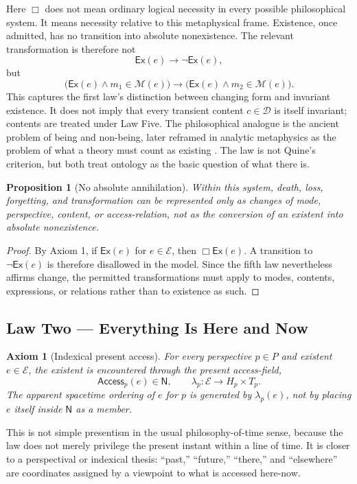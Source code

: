 \documentclass[11pt]{article}
\newtheorem{axiom}{Axiom}
\newtheorem{proposition}{Proposition}
\newcommand{\Ex}{\mathsf{Ex}}
\newcommand{\Now}{\mathsf{N}}
\newcommand{\Ent}{\mathcal{E}}
\newcommand{\Modes}{\mathcal{M}}
\newcommand{\Contents}{\mathcal{D}}
\newcommand{\Access}{\mathsf{Access}}
\begin{document}
Here $\Box$ does not mean ordinary logical necessity in every possible philosophical system.  It means necessity relative to this metaphysical frame.  Existence, once admitted, has no transition into absolute nonexistence.  The relevant transformation is therefore not
\[
\Ex(e) \longrightarrow \neg \Ex(e),
\]
but
\[
\bigl(\Ex(e)\wedge m_1\in\Modes(e)\bigr)
\longrightarrow
\bigl(\Ex(e)\wedge m_2\in\Modes(e)\bigr).
\]
This captures the first law's distinction between changing form and invariant existence.  It does not imply that every transient content $c\in\Contents$ is itself invariant; contents are treated under Law Five.  The philosophical analogue is the ancient problem of being and non-being, later reframed in analytic metaphysics as the problem of what a theory must count as existing \cite{Quine1948,Palmer2020}.  The law is not Quine's criterion, but both treat ontology as the basic question of what there is.

\begin{proposition}[No absolute annihilation]
Within this system, death, loss, forgetting, and transformation can be represented only as changes of mode, perspective, content, or access-relation, not as the conversion of an existent into absolute nonexistence.
\end{proposition}

\begin{proof}
By Axiom 1, if $\Ex(e)$ for $e\in\Ent$, then $\Box\Ex(e)$.  A transition to $\neg\Ex(e)$ is therefore disallowed in the model.  Since the fifth law nevertheless affirms change, the permitted transformations must apply to modes, contents, expressions, or relations rather than to existence as such.
\end{proof}

\subsection{Law Two --- Everything Is Here and Now}

\begin{axiom}[Indexical present access]
For every perspective $p\in P$ and existent $e\in\Ent$, the existent is encountered through the present access-field,
\[
\Access_p(e)\in\Now,
\qquad
\lambda_p:\Ent\to H_p\times T_p.
\]
The apparent spacetime ordering of $e$ for $p$ is generated by $\lambda_p(e)$, not by placing $e$ itself inside $\Now$ as a member.
\end{axiom}

This is not simple presentism in the usual philosophy-of-time sense, because the law does not merely privilege the present instant within a line of time.  It is closer to a perspectival or indexical thesis: ``past,'' ``future,'' ``there,'' and ``elsewhere'' are coordinates assigned by a viewpoint to what is accessed here-now.
\end{document}

